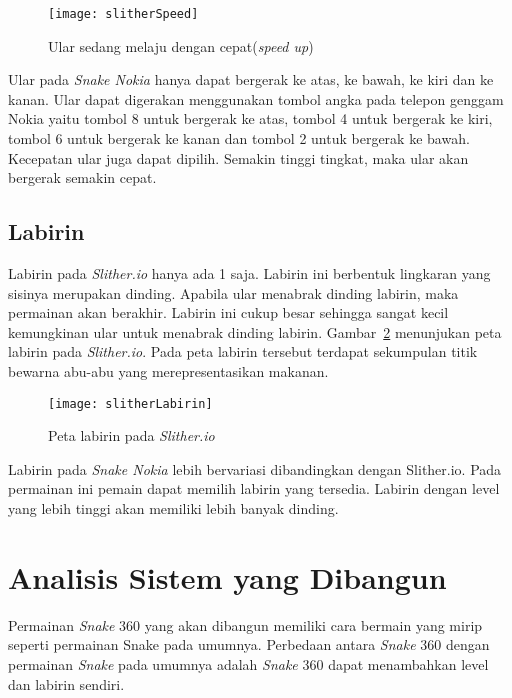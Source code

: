 \begin{figure}[H]
	\centering  
	\texttt{[image: slitherSpeed]}  
	\caption[Ular sedang melaju dengan cepat(\textit{speed up})]{Ular sedang melaju dengan cepat(\textit{speed up})}
	\label{fig:slitherSpeed} 
\end{figure}

Ular pada \textit{Snake Nokia} hanya dapat bergerak ke atas, ke bawah, ke kiri dan ke kanan. Ular dapat digerakan menggunakan tombol angka pada telepon genggam Nokia yaitu tombol 8 untuk bergerak ke atas, tombol 4 untuk bergerak ke kiri, tombol 6 untuk bergerak ke kanan dan tombol 2 untuk bergerak ke bawah. Kecepatan ular juga dapat dipilih. Semakin tinggi tingkat, maka ular akan bergerak semakin cepat.

\subsection{Labirin}
Labirin pada \textit{Slither.io} hanya ada 1 saja. Labirin ini berbentuk lingkaran yang sisinya merupakan dinding. Apabila ular menabrak dinding labirin, maka permainan akan berakhir. Labirin ini cukup besar sehingga sangat kecil kemungkinan ular untuk menabrak dinding labirin. Gambar~\ref{fig:slitherLabirin} menunjukan peta labirin pada \textit{Slither.io}. Pada peta labirin tersebut terdapat sekumpulan titik bewarna abu-abu yang merepresentasikan makanan.

\begin{figure}[H]
	\centering  
	\texttt{[image: slitherLabirin]}  
	\caption[Peta labirin pada \textit{Slither.io}]{Peta labirin pada \textit{Slither.io}}
	\label{fig:slitherLabirin} 
\end{figure}

Labirin pada \textit{Snake Nokia} lebih bervariasi dibandingkan dengan Slither.io. Pada permainan ini pemain dapat memilih labirin yang tersedia. Labirin dengan level yang lebih tinggi akan memiliki lebih banyak dinding. 

\section{Analisis Sistem yang Dibangun}
Permainan \textit{Snake} 360 yang akan dibangun memiliki cara bermain yang mirip seperti permainan Snake pada umumnya. Perbedaan antara \textit{Snake} 360 dengan permainan \textit{Snake} pada umumnya adalah \textit{Snake} 360 dapat menambahkan level dan labirin sendiri. 


